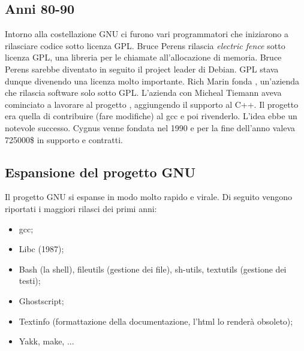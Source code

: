 \subsection{Anni 80-90}

Intorno alla costellazione GNU ci furono vari programmatori che iniziarono a rilasciare codice sotto licenza GPL. Bruce Perens rilascia \textit{electric fence} sotto licenza GPL, una libreria per le chiamate all'allocazione di memoria. Bruce Perens sarebbe diventato in seguito il project leader di Debian.
\linebreak
\linebreak
GPL stava dunque divenendo una licenza molto importante. Rich Marin fonda , un'azienda che rilascia software solo sotto GPL. L'azienda  con Micheal Tiemann aveva cominciato a lavorare al progetto , aggiungendo il supporto al C++. Il progetto era quella di contribuire (fare modifiche) al gcc e poi rivenderlo. L'idea ebbe un notevole successo. Cygnus venne fondata nel 1990 e per la fine dell'anno valeva 725000\$ in supporto e contratti.

\subsection{Espansione del progetto GNU}

Il progetto GNU si espanse in modo molto rapido e virale. Di seguito vengono riportati i maggiori rilasci dei primi anni:

\begin{itemize}

\item gcc;
\item Libc (1987);
\item Bash (la shell), fileutils (gestione dei file), sh-utils, textutils (gestione dei testi);
\item Ghostscript;
\item Textinfo (formattazione della documentazione, l'html lo renderà obsoleto);
\item Yakk, make, ...

\end{itemize}